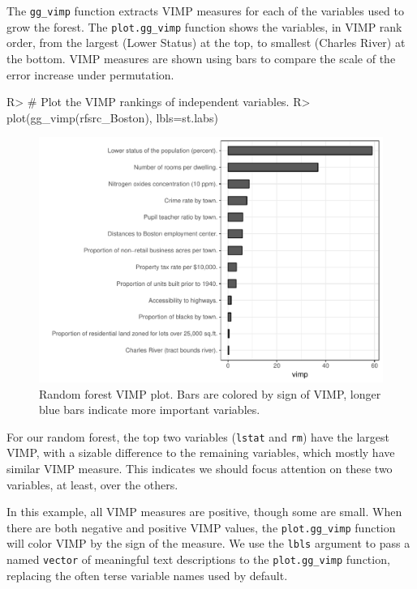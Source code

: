 \documentclass[article]{jss}
\begin{document}
The \texttt{gg\_vimp} function extracts VIMP measures for each of the
variables used to grow the forest. The \texttt{plot.gg\_vimp} function
shows the variables, in VIMP rank order, from the largest (Lower Status)
at the top, to smallest (Charles River) at the bottom. VIMP measures are
shown using bars to compare the scale of the error increase under
permutation.

\begin{CodeChunk}

\begin{CodeInput}
R> # Plot the VIMP rankings of independent variables.
R> plot(gg_vimp(rfsrc_Boston), lbls=st.labs)
\end{CodeInput}
\begin{figure}

{\centering \includegraphics{Regression-rfsrc_files/figure-latex/vimp-1} 

}

\caption[Random forest VIMP plot]{Random forest VIMP plot. Bars are colored by sign of VIMP, longer blue bars indicate more important variables.}\label{fig:vimp}
\end{figure}
\end{CodeChunk}

For our random forest, the top two variables (\texttt{lstat} and
\texttt{rm}) have the largest VIMP, with a sizable difference to the
remaining variables, which mostly have similar VIMP measure. This
indicates we should focus attention on these two variables, at least,
over the others.

In this example, all VIMP measures are positive, though some are small.
When there are both negative and positive VIMP values, the
\texttt{plot.gg\_vimp} function will color VIMP by the sign of the
measure. We use the \texttt{lbls} argument to pass a named
\texttt{vector} of meaningful text descriptions to the
\texttt{plot.gg\_vimp} function, replacing the often terse variable
names used by default.
\end{document}
